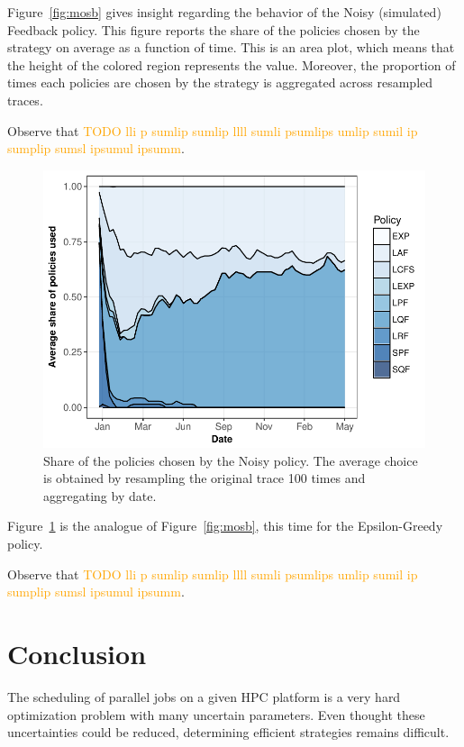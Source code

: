 \documentclass[sigconf,review,anonymous]{acmart}
\begin{document}
Figure~\ref{fig:mosb} gives insight regarding the behavior of the
Noisy (simulated) Feedback policy. This figure reports the share of the policies chosen
by the strategy on average as a function of time. This is an area plot, which means
that the height of the colored region represents the value. Moreover, the proportion of
times each policies are chosen by the strategy is aggregated across resampled traces.

Observe that \textcolor{orange}{TODO lli  p sumlip sumlip llll sumli psumlips umlip sumil ip sumplip sumsl  ipsumul   ipsumm}.

\begin{figure}[]
  \centering
  \includegraphics[scale=0.6]{figures/mosaic-UniLu-Ga.pdf}

  \caption{Share of the policies chosen by the Noisy policy. The average choice
  is obtained by resampling the original trace 100 times and aggregating by
  date.}

  \label{fig:mosn}
\end{figure}

Figure~\ref{fig:mosn} is the analogue of Figure~\ref{fig:mosb}, this time for
the Epsilon-Greedy policy.

Observe that \textcolor{orange}{TODO lli  p sumlip sumlip llll sumli psumlips umlip sumil ip sumplip sumsl  ipsumul   ipsumm}.

\section{Conclusion}
\label{sec:ccl}

The scheduling of parallel jobs on a given HPC platform is a very hard
optimization problem with many uncertain parameters. Even thought these
uncertainties could be reduced, determining efficient strategies remains
difficult.
\end{document}
